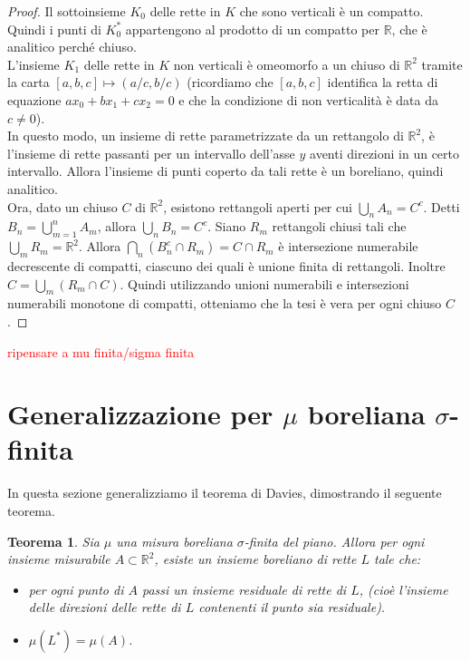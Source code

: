 \documentclass[a4paper, twoside,openright]{article}
\newcommand{\R}{\mathbb{R}}
\newcommand{\<}{\langle}
\renewcommand{\>}{\rangle}
\newtheorem{teo}{Teorema}[]
\begin{document}
\begin{proof}
Il sottoinsieme $K_0$ delle rette in $K$ che sono verticali è un compatto. Quindi i punti di $K_0^*$ appartengono al prodotto di un compatto per $\R$, che è analitico perché chiuso.\\

L'insieme $K_1$ delle rette in $K$ non verticali è omeomorfo a un chiuso di $\R^2$ tramite la carta $[a,b,c] \mapsto (a/c,b/c)$ (ricordiamo che $[a,b,c]$ identifica la retta di equazione $ax_0+bx_1+cx_2=0$ e che la condizione di non verticalità è data da $c \neq 0$).\\
In questo modo, un insieme di rette parametrizzate da un rettangolo di $\R^2$, è l'insieme di rette passanti per un intervallo dell'asse $y$ aventi direzioni in un certo intervallo. Allora l'insieme di punti coperto da tali rette è un boreliano, quindi analitico.\\
Ora, dato un chiuso $C$ di $\R^2$, esistono rettangoli aperti per cui $\bigcup_n A_n = C^c$. Detti $B_n = \bigcup_{m=1}^n A_m$, allora $\bigcup_n B_n = C^c$. Siano $R_m$ rettangoli chiusi tali che $\bigcup_m R_m = \R^2$. Allora $\bigcap_n(B_n^c \cap R_m)=C \cap R_m$ è intersezione numerabile decrescente di compatti, ciascuno dei quali è unione finita di rettangoli. Inoltre $C=\bigcup_m(R_m \cap C)$. Quindi utilizzando unioni numerabili e intersezioni numerabili monotone di compatti, otteniamo che la tesi è vera per ogni chiuso $C$.
\end{proof}
\textcolor{red}{ripensare a mu finita/sigma finita}
\newpage


\section{Generalizzazione per $\mu$ boreliana $\sigma$-finita}

In questa sezione generalizziamo il teorema di Davies, dimostrando il seguente teorema.


\begin{teo} \label{teo1}
	Sia $\mu$ una misura boreliana $\sigma$-finita del piano. Allora per ogni insieme misurabile $A \subset \mathbb{R}^{2}$, esiste un insieme boreliano di rette $L$ tale che:
	\begin{itemize}
		\item per ogni punto di $A$ passi un insieme residuale di rette di $L$, (cioè l'insieme delle direzioni delle rette di $L$ contenenti il punto sia residuale).
		\item $\mu\left(L^{*}\right)=\mu(A)$.
	\end{itemize}
\end{teo}
\end{document}

